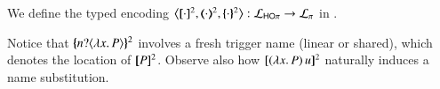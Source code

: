 \smallskip 

\begin{definition}
\label{d:enc:hopitopi}
We define the typed encoding 
$\enco{\map{\cdot}^{2}, \mapt{\cdot}^{2}, \mapa{\cdot}^{2}}: \tyl{L}_{\HOp} \to \tyl{L}_{\sessp}$  
in . 
\end{definition}

\smallskip 
\noi 
Notice that $\{\!\!\{n ? \langle \lambda  x.\,P \rangle \}\!\!\}^2$ involves a fresh
trigger name (linear or shared), 
which denotes the location of $[\!\![P]\!\!]^2$. 
Observe also how $[\!\![(\lambda x.\,P)\, {u}]\!\!]^2$ naturally induces a name substitution.
\smallskip 
